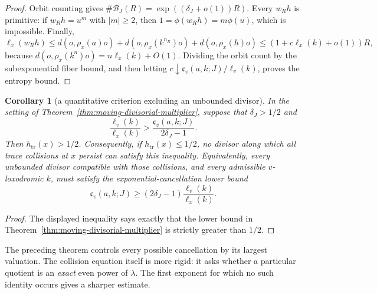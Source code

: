 \documentclass[11pt,reqno]{amsart}
\newtheorem{corollary}[theorem]{Corollary}
\theoremstyle{definition}
\theoremstyle{remark}
\newcommand{\Tr}{\operatorname{tr}}
\begin{document}
\begin{proof}
Orbit counting gives
\(\#\mathcal B_J(R)=\exp((\delta_J+o(1))R)\).  Every \(w_Rh\) is primitive:
if \(w_Rh=u^m\) with \(|m|\ge2\), then
\(1=\phi(w_Rh)=m\phi(u)\), which is impossible.  Finally,
\[
 \ell_x(w_Rh)
 \le d(o,\rho_x(a)o)+d(o,\rho_x(k^{n_R})o)
       +d(o,\rho_x(h)o)
 \le (1+c\ell_x(k)+o(1))R,
\]
because \(d(o,\rho_x(k^n)o)=n\ell_x(k)+O(1)\).  Dividing the orbit count
by the subexponential fiber bound, and then letting
\(c\downarrow\mathfrak c_v(a,k;J)/\ell_v(k)\), proves the entropy bound.
\end{proof}

\begin{corollary}[a quantitative criterion excluding an unbounded divisor]
\label{cor:divisorial-half-entropy}
In the setting of
Theorem~\ref{thm:moving-divisorial-multiplier}, suppose that
\(\delta_J>1/2\) and
\[
 \frac{\ell_v(k)}{\ell_x(k)}>
 \frac{\mathfrak c_v(a,k;J)}{2\delta_J-1}.
\]
Then \(h_{\Tr}(x)>1/2\).  Consequently, if \(h_{\Tr}(x)\le1/2\), no
divisor along which all trace collisions at \(x\) persist can satisfy this
inequality.  Equivalently, every unbounded divisor compatible with those
collisions, and every admissible \(v\)-loxodromic \(k\),
must satisfy the exponential-cancellation lower bound
\[
 \mathfrak c_v(a,k;J)\ge
 (2\delta_J-1)\frac{\ell_v(k)}{\ell_x(k)}.
\]
\end{corollary}

\begin{proof}
The displayed inequality says exactly that the lower bound in
Theorem~\ref{thm:moving-divisorial-multiplier} is strictly greater than
\(1/2\).
\end{proof}

The preceding theorem controls every possible cancellation by its largest
valuation.  The collision equation itself is more rigid: it asks whether a
particular quotient is an \emph{exact} even power of \(\lambda\).  The first
exponent for which no such identity occurs gives a sharper estimate.
\end{document}
